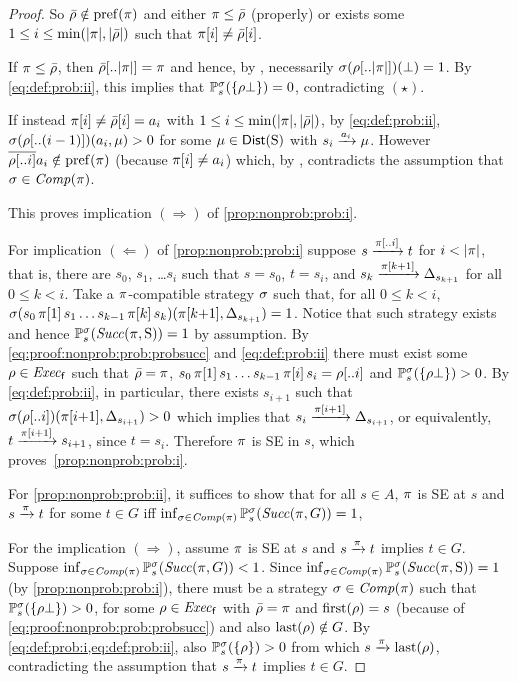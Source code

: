 \begin{proof}
  So $\bar{\rho}\notin\mathrm{pref}(\pi)$ and either $\pi\leq\bar{\rho}$
  (properly) or exists some $1\leq i \leq\min({|}{\pi}{|},{|}{\bar{\rho}}{|})$
  such that $\pi[i]\neq\bar{\rho}[i]$.

  If $\pi\leq\bar{\rho}$, then $\bar{\rho}[..{|}{\pi}{|}]=\pi$ and
  hence, by , necessarily
  $\sigma(\rho[..{|}{\pi}{|}])(\bot) = 1$.  By \cref{eq:def:prob:ii},
  this implies that $\mathbb{P}^\sigma_s(\{\rho\bot\})=0$,
  contradicting $(\star)$.

  If instead $\pi[i]\neq\bar{\rho}[i]=a_i$ with
  $1\leq i \leq\min({|}{\pi}{|},{|}{\bar{\rho}}{|})$, by \cref{eq:def:prob:ii},
  $\sigma(\rho[..(i-1)])(a_i,\mu) > 0$ for some
  $\mu\in\mathsf{Dist}(\operatorname{S})$ with $s_i\xrightarrow{a_i}\mu$.
  However $\overline{\rho[..i]}a_i \notin \mathrm{pref}(\pi)$
  (because $\pi[i]\neq a_i$) which, by
  , contradicts the assumption that
  $\sigma\in\mathit{Comp}(\pi)$.

  This proves implication $(\Rightarrow)$ of \cref{prop:nonprob:prob:i}.

  For implication $(\Leftarrow)$ of \cref{prop:nonprob:prob:i} suppose
  $s\xrightarrow{\pi[..i]}t$ for $i<{|}{\pi}{|}$, that is, there are $s_0$,
  $s_1$, \ldots $s_i$ such that $s=s_0$, $t=s_i$, and
  $s_k\xrightarrow{\pi[k{+}1]}\Delta_{s_{k{+}1}}$ for all $0\leq k < i$.
  Take a $\pi$-compatible strategy $\sigma$ such that, for all
  $0\leq k < i$,
  $\sigma(s_0\,\pi[1]\,s_1\ldots s_{k{-}1}\,\pi[k]\,s_k)(\pi[k{+}1],\Delta_{s_{k{+}1}})=1$.
  Notice that such strategy exists and hence
  $\mathbb{P}^\sigma_s(\mathit{Succ}(\pi,\operatorname{S}))=1$ by assumption.
  By \cref{eq:proof:nonprob:prob:probsucc} and \cref{eq:def:prob:ii}
  there must exist some $\rho\in\mathit{Exec}_{\mathsf{f}}$ such that $\bar{\rho}=\pi$,
  $s_0\,\pi[1]\,s_1\ldots s_{k{-}1}\,\pi[i]\,s_i = \rho[..i]$ and
  $\mathbb{P}^\sigma_s(\{\rho\bot\})>0$.  By \cref{eq:def:prob:ii}, in
  particular, there exists $s_{i{+}1}$ such that
  $\sigma(\rho[..i])(\pi[i{+}1],\Delta_{s_{i{+}1}})> 0$ which
  implies that $s_i\xrightarrow{\pi[i{+}1]}\Delta_{s_{i{+}1}}$, or
  equivalently, $t\xrightarrow{\pi[i{+}1]}s_{i{+}1}$, since $t=s_i$.
  Therefore $\pi$ is SE in $s$, which proves~\cref{prop:nonprob:prob:i}.

  For \cref{prop:nonprob:prob:ii}, it suffices to show that for all
  $s\in A$, $\pi$ is SE at $s$ and $s \xrightarrow{\pi} t$ for some
  $t\in G$ iff
  $\inf_{\sigma\in\mathit{Comp}(\pi)}\mathbb{P}^\sigma_s(\mathit{Succ}(\pi,G))=1$,

  For the implication $(\Rightarrow)$, assume $\pi$ is SE at $s$ and
  $s \xrightarrow{\pi} t$ implies $t\in G$.
  Suppose
  $\inf_{\sigma\in\mathit{Comp}(\pi)}\mathbb{P}^\sigma_s(\mathit{Succ}(\pi,G))<1$.
  Since
  $\inf_{\sigma\in\mathit{Comp}(\pi)}\mathbb{P}^\sigma_s(\mathit{Succ}(\pi,\operatorname{S}))=1$ (by
  \cref{prop:nonprob:prob:i}), there must be a strategy
  $\sigma\in\mathit{Comp}(\pi)$ such that
  $\mathbb{P}^\sigma_s(\{\rho\bot\})>0$, for some $\rho\in\mathit{Exec}_{\mathsf{f}}$ with
  $\bar{\rho}=\pi$ and $\mathrm{first}(\rho)=s$ (because of
  \cref{eq:proof:nonprob:prob:probsucc}) and also $\mathrm{last}(\rho)\notin G$.
  By \cref{eq:def:prob:i,eq:def:prob:ii}, also
  $\mathbb{P}^\sigma_s(\{\rho\})>0$ from which $s\xrightarrow{\pi}\mathrm{last}(\rho)$,
  contradicting the assumption that $s \xrightarrow{\pi} t$ implies
  $t\in G$.


\end{proof}
